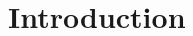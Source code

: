 \documentclass{intech-journal}
\begin{document}
\maketitle

\articleabstract{}
\keywords{}

\section{Introduction}


\begin{thebibliography}{500} %

\end{thebibliography}
\end{document}
